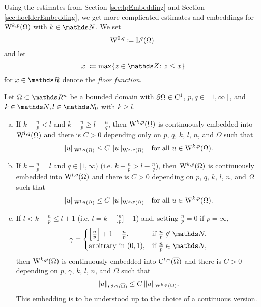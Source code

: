 Using the estimates from Section \ref{sec:lpEmbedding} and Section \ref{sec:hoelderEmbedding}, we get more complicated estimates and embeddings for $\mathrm{W}^{k,p}(\Omega)$ with $k \in \N$.
We set
$$
\mathrm{W}^{0,q} \coloneqq \mathrm{L}^q(\Omega)
$$
and let
$$
[x] \coloneqq \max \{ z \in \Z \colon z \leq x\}
$$
for $x \in \R$ denote the \emph{floor function}.

\begin{thm}
  Let $\Omega \subset \R^n$ be a bounded domain with $\partial\Omega \in \mathrm{C}^1$, $p,q \in [1,\infty]$, and $k \in \N, l \in \N_0$ with $k \geq l$.
  \begin{enumerate}[a)]
    \item If $k - \frac{n}{p} < l$ and $k - \frac{n}{p} \geq l - \frac{n}{q}$, then $\mathrm{W}^{k,p}(\Omega)$ is continuously embedded into $\mathrm{W}^{l,q}(\Omega)$ and there is $C > 0$ depending only on $p$, $q$, $k$, $l$, $n$, and $\Omega$ such that
      $$
      \|u\|_{\mathrm{W}^{l,q}(\Omega)} \leq C \, \|u\|_{\mathrm{W}^{k,p}(\Omega)} \quad\text{for all } u \in \mathrm{W}^{k,p}(\Omega).
      $$

    \item If $k - \frac{n}{p} = l$ and $q \in [1,\infty)$ (i.e. $k - \frac{n}{p} > l - \frac{n}{q}$), then $\mathrm{W}^{k,p}(\Omega)$ is continuously embedded into $\mathrm{W}^{l,q}(\Omega)$ and there is $C > 0$ depending on $p$, $q$, $k$, $l$, $n$, and $\Omega$ such that
      $$
      \|u\|_{\mathrm{W}^{l,q}(\Omega)} \leq C \, \|u\|_{\mathrm{W}^{k,p}(\Omega)} \quad\text{for all } u \in \mathrm{W}^{k,p}(\Omega).
      $$

    \item If $l < k - \frac{n}{p} \leq l + 1$ (i.e. $l = k - \Big[\frac{n}{p}\Big] - 1$) and, setting $\frac{n}{p} = 0$ if $p = \infty$,
      $$
      \gamma = \begin{cases} \Big[ \frac{n}{p} \Big] + 1 - \frac{n}{p}, &\text{if } \frac{n}{p} \not \in \N, \\ \text{arbitrary in }(0,1), &\text{if } \frac{n}{p} \in \N, \end{cases}
      $$
      then $\mathrm{W}^{k,p}(\Omega)$ is continuously embedded into $\mathrm{C}^{l,\gamma}(\overline\Omega)$ and there is $C > 0$ depending on $p$, $\gamma$, $k$, $l$, $n$, and $\Omega$ such that
      $$
      \| u\|_{\mathrm{C}^{l,\gamma}(\overline\Omega)} \leq C \, \|u\|_{\mathrm{W}^{k,p}(\Omega)}.
      $$
      This embedding is to be understood up to the choice of a continuous version.
  \end{enumerate}
\end{thm}

